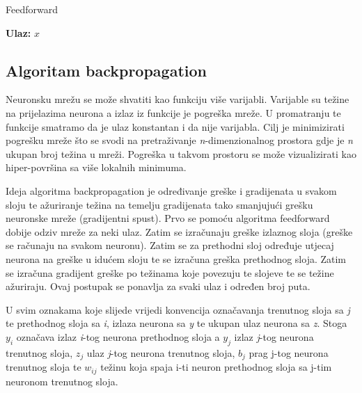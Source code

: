 \documentclass[times, utf8, zavrsni, numeric]{fer}
\begin{document}
\renewcommand{\algorithmicfor}{\textbf{za}}
\renewcommand{\algorithmicend}{\textbf{kraj}}
\renewcommand{\algorithmicwhile}{\textbf{dok}}
\renewcommand{\algorithmicdo}{\textbf{radi}}
\renewcommand{\algorithmicif}{\textbf{ako}}
\renewcommand{\algorithmicelse}{\textbf{inače}}
\renewcommand{\algorithmicthen}{\textbf{onda}}
\begin{algorithm}
\caption{Feedforward}
\label{alg:feedforward}
\begin{algorithmic}
\STATE \textbf{Ulaz:} $x$
\ENDFOR
\end{algorithmic}
\end{algorithm}
\subsection{Algoritam backpropagation}
Neuronsku mrežu se može shvatiti kao funkciju više varijabli. Varijable su težine na prijelazima neurona a izlaz iz funkcije je pogreška mreže. U promatranju te funkcije smatramo da je ulaz konstantan i da nije varijabla. Cilj je minimizirati pogrešku mreže što se svodi na pretraživanje \textit{n}-dimenzionalnog prostora gdje je \textit{n} ukupan broj težina u mreži. Pogreška u takvom prostoru se može vizualizirati kao hiper-površina sa više lokalnih minimuma.

Ideja algoritma backpropagation je određivanje greške i gradijenata u svakom sloju te ažuriranje težina na temelju gradijenata tako smanjujući grešku neuronske mreže (gradijentni spust). Prvo se pomoću algoritma feedforward dobije odziv mreže za neki ulaz. Zatim se izračunaju greške izlaznog sloja (greške se računaju na svakom neuronu). Zatim se za prethodni sloj određuje utjecaj neurona na greške u idućem sloju te se izračuna greška prethodnog sloja. Zatim se izračuna gradijent greške po težinama koje povezuju te slojeve te se težine ažuriraju. Ovaj postupak se ponavlja za svaki ulaz i određen broj puta.

U svim oznakama koje slijede vrijedi konvencija označavanja trenutnog sloja sa \textit{j} te prethodnog sloja sa \textit{i}, izlaza neurona sa \textit{y} te ukupan ulaz neurona sa \textit{z}. Stoga $y_{i}$ označava izlaz \textit{i}-tog neurona prethodnog sloja a $y_{j}$ izlaz \textit{j}-tog neurona trenutnog sloja, $z_{j}$ ulaz \textit{j}-tog neurona trenutnog sloja, $b_j$ prag j-tog neurona trenutnog sloja te $w_{ij}$ težinu koja spaja i-ti neuron prethodnog sloja sa j-tim neuronom trenutnog sloja.
\end{document}
